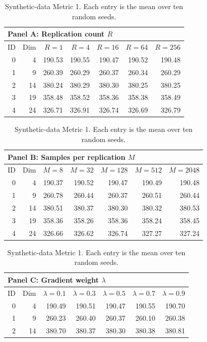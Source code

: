 \begin{table}[htbp]
\centering
\small
\setlength{\tabcolsep}{6pt}
\renewcommand{\arraystretch}{1.08}
\caption{Synthetic-data Metric 1. Each entry is the mean over ten random seeds.}
\label{tab:syn_all_parameters_metric1}
\begin{tabular}{rrrrrrr}
\toprule
\multicolumn{7}{l}{\textbf{Panel A: Replication count $R$}} \\
\midrule
ID & Dim & $R=1$ & $R=4$ & $R=16$ & $R=64$ & $R=256$ \\
\midrule
0 & 4 & 190.53 & 190.55 & 190.47 & 190.52 & 190.48 \\
1 & 9 & 260.39 & 260.29 & 260.37 & 260.34 & 260.29 \\
2 & 14 & 380.24 & 380.29 & 380.30 & 380.25 & 380.25 \\
3 & 19 & 358.48 & 358.52 & 358.36 & 358.38 & 358.49 \\
4 & 24 & 326.71 & 326.91 & 326.74 & 326.69 & 326.79 \\
\bottomrule
\end{tabular}
\par\medskip
\begin{tabular}{rrrrrrr}
\toprule
\multicolumn{7}{l}{\textbf{Panel B: Samples per replication $M$}} \\
\midrule
ID & Dim & $M=8$ & $M=32$ & $M=128$ & $M=512$ & $M=2048$ \\
\midrule
0 & 4 & 190.37 & 190.52 & 190.47 & 190.49 & 190.48 \\
1 & 9 & 260.78 & 260.44 & 260.37 & 260.51 & 260.44 \\
2 & 14 & 380.51 & 380.37 & 380.30 & 380.32 & 380.53 \\
3 & 19 & 358.36 & 358.26 & 358.36 & 358.24 & 358.45 \\
4 & 24 & 326.66 & 326.62 & 326.74 & 327.27 & 327.24 \\
\bottomrule
\end{tabular}
\par\medskip
\begin{tabular}{rrrrrrr}
\toprule
\multicolumn{7}{l}{\textbf{Panel C: Gradient weight $\lambda$}} \\
\midrule
ID & Dim & $\lambda=0.1$ & $\lambda=0.3$ & $\lambda=0.5$ & $\lambda=0.7$ & $\lambda=0.9$ \\
\midrule
0 & 4 & 190.49 & 190.51 & 190.47 & 190.55 & 190.70 \\
1 & 9 & 260.23 & 260.40 & 260.37 & 260.10 & 260.38 \\
2 & 14 & 380.70 & 380.37 & 380.30 & 380.38 & 380.81 \\

\end{tabular}
\end{table}
